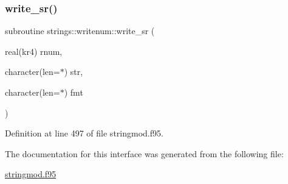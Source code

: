 \subsubsection{\texorpdfstring{write\+\_\+sr()}{write\_sr()}}
{\footnotesize\ttfamily subroutine strings\+::writenum\+::write\+\_\+sr (\begin{DoxyParamCaption}\item[{real(kr4)}]{rnum,  }\item[{character(len=$\ast$)}]{str,  }\item[{character(len=$\ast$)}]{fmt }\end{DoxyParamCaption})}



Definition at line 497 of file stringmod.\+f95.



The documentation for this interface was generated from the following file\+:\begin{DoxyCompactItemize}
\item 
\hyperlink{stringmod_8f95}{stringmod.\+f95}\end{DoxyCompactItemize}
